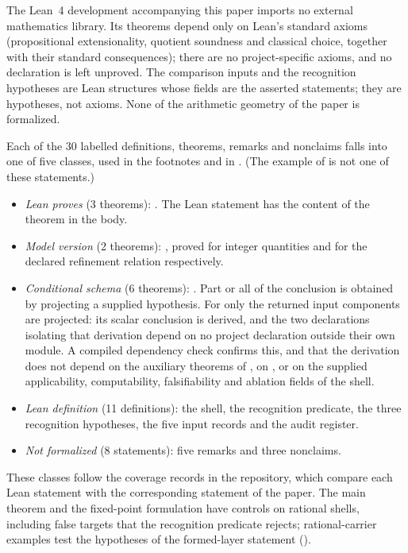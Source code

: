 \documentclass[11pt]{article}
\theoremstyle{definition}
\begin{document}
The Lean~4 development accompanying this paper imports no external
mathematics library.  Its theorems depend only on Lean's standard axioms
(propositional extensionality, quotient soundness and classical choice,
together with their standard consequences); there are no project-specific
axioms, and no declaration is left unproved.  The comparison inputs and
the recognition hypotheses are Lean structures whose fields are the
asserted statements; they are hypotheses, not axioms.  None of the
arithmetic geometry of the paper is formalized.

Each of the $30$ labelled definitions, theorems, remarks and nonclaims
falls into one of five classes, used in the footnotes and in
.  (The example of 
is not one of these statements.)
\begin{itemize}
\item \emph{Lean proves} (3 theorems):
  .
  The Lean statement has the content of the theorem in the body.
\item \emph{Model version} (2 theorems):
  ,
  proved for integer quantities and for the declared refinement relation
  respectively.
\item \emph{Conditional schema} (6 theorems):
  .
  Part or all of the conclusion is obtained by projecting a supplied
  hypothesis.  For  only the
  returned input components are projected: its scalar conclusion is
  derived, and the two declarations isolating that derivation depend on
  no project declaration outside their own module.  A compiled dependency check
  confirms this, and that the derivation does not depend on the auxiliary
  theorems of , on
  , or on the supplied applicability,
  computability, falsifiability and ablation fields of the shell.
\item \emph{Lean definition} (11 definitions): the shell, the
  recognition predicate, the three recognition hypotheses, the five input
  records and the audit register.
\item \emph{Not formalized} (8 statements): five remarks and three
  nonclaims.
\end{itemize}
These classes follow the coverage records in the repository, which compare
each Lean statement with the corresponding statement of the paper.  The
main theorem and the fixed-point formulation have controls on rational
shells, including false targets that the recognition predicate rejects;
rational-carrier examples test the hypotheses of the formed-layer
statement ().
\end{document}
